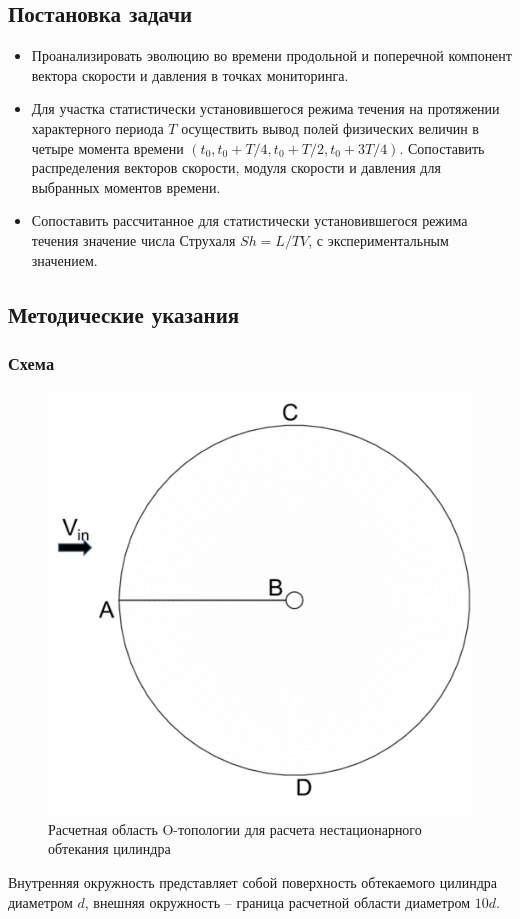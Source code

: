 \documentclass[12pt, a4paper]{article}
\begin{document}
\subsection{Постановка задачи}
\begin{itemize}
    \item 
        Проанализировать эволюцию во времени продольной и поперечной компонент вектора скорости и давления в точках мониторинга.
    \item
        Для участка статистически установившегося режима течения на протяжении характерного периода $T$ осуществить вывод полей физических величин в четыре момента времени $(t_0, t_0 + T/4, t_0 + T/2, t_0 + 3T/4)$. Сопоставить распределения векторов скорости, модуля скорости и давления для выбранных моментов времени.
    \item
        Сопоставить рассчитанное для статистически установившегося режима течения значение числа Струхаля $Sh = L/TV$, с экспериментальным значением. 
\end{itemize}

\subsection{Методические указания}
\subsubsection{Схема}
\begin{figure}[H]
    \centering
    \includegraphics{figure/Рисунок1.png}
    \caption{Расчетная область O-топологии для расчета нестационарного обтекания цилиндра}
    \label{fig:my_label}
\end{figure}
Внутренняя окружность представляет собой поверхность обтекаемого цилиндра диаметром $d$, внешняя окружность – граница расчетной области диаметром $10d$. 
\end{document}

